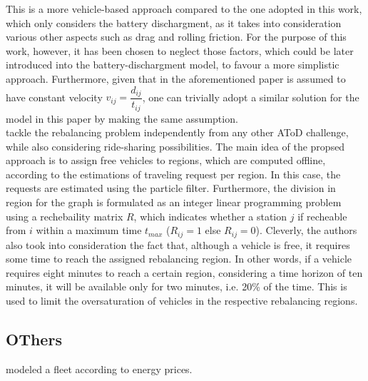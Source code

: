 This is a more vehicle-based approach compared to the one adopted in this work, which only considers the battery dischargment, as it takes into consideration various other aspects such as drag and rolling friction. For the purpose of this work, however, it has been chosen to neglect those factors, which could be later introduced into the battery-dischargment model, to favour a more simplistic approach. Furthermore, given that in the aforementioned paper is assumed to have constant velocity $v_{ij} = \dfrac{d_{ij}}{t_{ij}}$, one can trivially adopt a similar solution for the model in this paper by making the same assumption. \\
 tackle the rebalancing problem independently from any other AToD challenge, while also considering ride-sharing possibilities. The main idea of the propsed approach is to assign free vehicles to regions, which are computed offline, according to the estimations of traveling request per region. In this case, the requests are estimated using the particle filter. Furthermore, the division in region for the graph is formulated as an integer linear programming problem using a rechebaility matrix $R$, which indicates whether a station $j$ if recheable from $i$ within a maximum time $t_{max}$ ($R_{ij} = 1$ else $R_{ij} = 0$). Cleverly, the authors also took into consideration the fact that, although a vehicle is free, it requires some time to reach the assigned rebalancing region. In other words, if a vehicle requires eight minutes to reach a certain region, considering a time horizon of ten minutes, it will be available only for two minutes, i.e. 20\% of the time. This is used to limit the oversaturation of vehicles in the respective rebalancing regions.  

\subsection*{OThers}
 modeled a fleet according to energy prices.